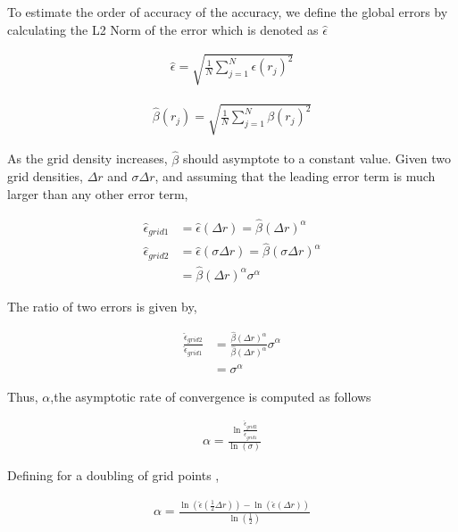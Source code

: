 To estimate the order of accuracy of the accuracy, we define the global errors 
by calculating the L2 Norm of the error which is denoted as $\hat{\epsilon}$ 

\begin{align*}
    \hat{\epsilon} = \sqrt{\frac{1}{N}\sum_{j=1}^{N} \epsilon(r_j)^2  }
\end{align*}

\begin{align*}
    \hat{\beta}(r_j) = \sqrt{\frac{1}{N}\sum_{j=1}^{N} \beta(r_j)^2  }
\end{align*}

As the grid density increases, $\hat{\beta}$ should asymptote to a constant 
value. Given two grid densities, $\Delta r$ and $\sigma\Delta r$, and assuming
that the leading error term is much larger than any other error term,

\begin{align*}
    \hat{\epsilon}_{grid 1} &= \hat{\epsilon}(\Delta r) = \hat{\beta}(\Delta r)^{\alpha} \\
    \hat{\epsilon}_{grid 2} &= \hat{\epsilon}(\sigma \Delta r) = \hat{\beta}(\sigma \Delta r)^{\alpha} \\
                            &= \hat{\beta}(\Delta r)^{\alpha} \sigma^{\alpha}
\end{align*}

The ratio of two errors is given by,

\begin{align*}
    \frac{\hat{\epsilon}_{grid 2}}{\hat{\epsilon}_{grid 1}} &= 
    \frac{\hat{\beta}(\Delta r )^{\alpha}}{\hat{\beta}(\Delta r )^{\alpha}} \sigma^{\alpha} \\ &= \sigma^{\alpha}
\end{align*}

Thus, $\alpha$,the asymptotic rate of convergence is computed as follows 

\begin{align*}
    \alpha = \frac{
        \ln \frac{
            \hat{\epsilon}_{grid 2}
    }{\hat{\epsilon}_{grid 1} }}
    {\ln\left( \sigma \right) }
\end{align*}

Defining  for a doubling of grid points ,

\begin{align*}
    \alpha = \frac{\ln \left( \hat{\epsilon}\left( \frac{1}{2}\Delta  r\right)
            \right) -\ln \left( \hat{\epsilon}\left( \Delta  r\right)
    \right)}{\ln \left( \frac{1}{2} \right)}
\end{align*}

%
%
%
%
